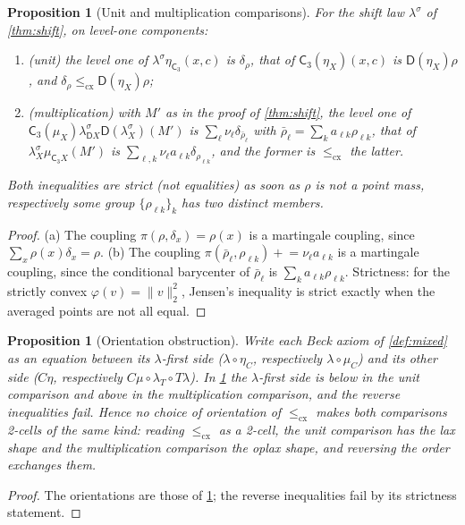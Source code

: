 \documentclass[11pt]{article}
\newtheorem{proposition}[theorem]{Proposition}
\theoremstyle{definition}
\theoremstyle{remark}
\newcommand{\D}{\mathsf{D}}
\newcommand{\C}{\mathsf{C}}
\newcommand{\ls}{\lambda^{\sigma}}
\begin{document}
\begin{proposition}[Unit and multiplication comparisons]\label{prop:cx-beck}
For the shift law $\ls$ of \cref{thm:shift}, on level-one components:
\begin{enumerate}[label=(\alph*)]
\item (unit) the level one of $\ls\eta_{\C_3}(x,c)$ is $\delta_\rho$, that of $\C_3(\eta_X)(x,c)$ is
  $\D(\eta_X)\rho$, and $\delta_\rho\le_{\mathrm{cx}}\D(\eta_X)\rho$;
\item (multiplication) with $M'$ as in the proof of \cref{thm:shift}, the level one of
  $\C_3(\mu_X)\ls_{\D X}\D(\ls_X)(M')$ is
  $\sum_\ell\nu_\ell\delta_{\bar\rho_\ell}$ with $\bar\rho_\ell=\sum_ka_{\ell k}\rho_{\ell k}$, that of
  $\ls_X\mu_{\C_3X}(M')$ is $\sum_{\ell,k}\nu_\ell a_{\ell k}\delta_{\rho_{\ell k}}$, and the former is
  $\le_{\mathrm{cx}}$ the latter.
\end{enumerate}
Both inequalities are strict (not equalities) as soon as $\rho$ is not a point mass, respectively some
group $\{\rho_{\ell k}\}_k$ has two distinct members.
\end{proposition}
\begin{proof}
(a) The coupling $\pi(\rho,\delta_x)=\rho(x)$ is a martingale coupling, since
$\sum_x\rho(x)\delta_x=\rho$. (b) The coupling $\pi(\bar\rho_\ell,\rho_{\ell k})\mathrel{+}=\nu_\ell
a_{\ell k}$ is a martingale coupling, since the conditional barycenter of $\bar\rho_\ell$ is
$\sum_ka_{\ell k}\rho_{\ell k}$. Strictness: for the strictly convex $\varphi(v)=\lVert v\rVert_2^2$,
Jensen's inequality is strict exactly when the averaged points are not all equal.
\end{proof}

\begin{proposition}[Orientation obstruction]\label{prop:cx-orient}
Write each Beck axiom of \cref{def:mixed} as an equation between its \emph{$\lambda$-first side}
($\lambda\circ\eta_C$, respectively $\lambda\circ\mu_C$) and its other side ($C\eta$, respectively
$C\mu\circ\lambda_T\circ T\lambda$). In \cref{prop:cx-beck} the $\lambda$-first side is \emph{below} in
the unit comparison and \emph{above} in the multiplication comparison, and the reverse inequalities
fail. Hence no choice of orientation of $\le_{\mathrm{cx}}$ makes both comparisons 2-cells of the same
kind: reading $\le_{\mathrm{cx}}$ as a 2-cell, the unit comparison has the lax shape and the
multiplication comparison the oplax shape, and reversing the order exchanges them.
\end{proposition}
\begin{proof}
The orientations are those of \cref{prop:cx-beck}; the reverse inequalities fail by its strictness
statement.
\end{proof}
\end{document}
